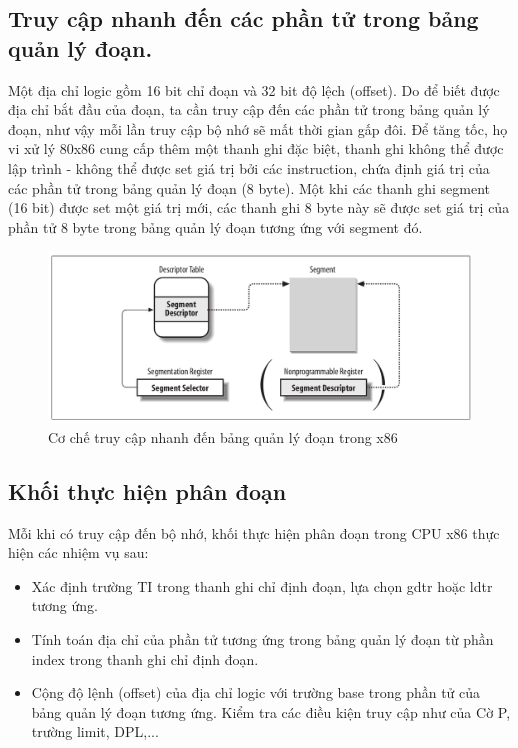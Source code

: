 \documentclass[12pt]{report}
\begin{document}
\subsection{Truy cập nhanh đến các phần tử trong bảng quản lý đoạn.}
Một địa chỉ logic gồm 16 bit chỉ đoạn và 32 bit độ lệch (offset). Do để biết được địa chỉ bắt đầu của đoạn, ta cần truy cập đến các phần tử trong bảng quản lý đoạn, như vậy mỗi lần truy cập bộ nhớ sẽ mất thời gian gấp đôi. Để tăng tốc, họ vi xử lý 80x86 cung cấp thêm một thanh ghi đặc biệt, thanh ghi không thể được lập trình - không thể được set giá trị bởi các instruction, chứa định giá trị của các phần tử trong bảng quản lý đoạn (8 byte). Một khi các thanh ghi segment (16 bit) được set một giá trị mới, các thanh ghi 8 byte này sẽ được set giá trị của phần tử 8 byte trong bảng quản lý đoạn tương ứng với segment đó. 

\begin{figure}[h]
\centering
\caption{Cơ chế truy cập nhanh đến bảng quản lý đoạn trong x86}
\includegraphics[width=\textwidth]{fast_access_gdt.png}
\end{figure}



\subsection{Khối thực hiện phân đoạn}
Mỗi khi có truy cập đến bộ nhớ, khối thực hiện phân đoạn trong CPU x86 thực hiện các nhiệm vụ sau: 
\begin{itemize}
\item Xác định trường TI trong thanh ghi chỉ định đoạn, lựa chọn gdtr hoặc ldtr tương ứng. 
\item Tính toán địa chỉ của phần tử tương ứng trong bảng quản lý đoạn từ phần index trong thanh ghi chỉ định đoạn. 
\item Cộng độ lệnh (offset) của địa chỉ logic với trường base trong phần tử của bảng quản lý đoạn tương ứng. Kiểm tra các điều kiện truy cập như của Cờ P, trường limit, DPL,...
\end{itemize}
\end{document}
